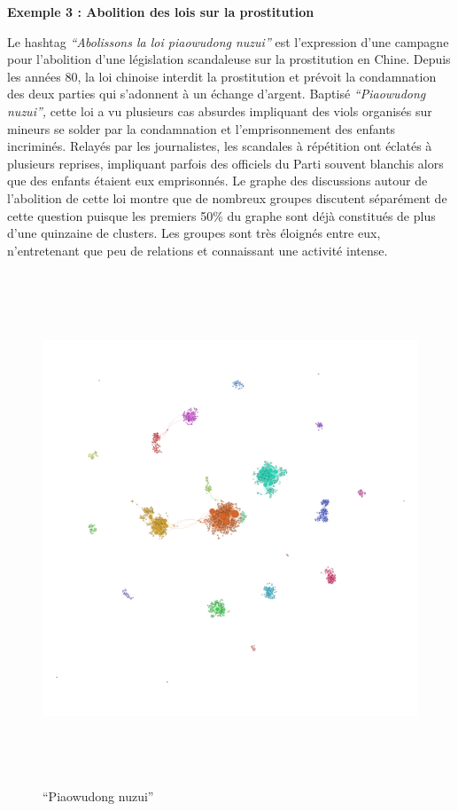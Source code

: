 \clearpage
\textbf{Exemple 3 : Abolition des lois sur la prostitution}

Le hashtag \textit{{\textquotedblleft}Abolissons la loi piaowudong
nuzui{\textquotedblright} }est l{\textquoteright}expression
d{\textquoteright}une campagne pour l{\textquoteright}abolition
d{\textquoteright}une l\'egislation scandaleuse sur la prostitution en
Chine. Depuis les ann\'ees 80, la loi chinoise interdit la prostitution
et pr\'evoit la condamnation des deux parties qui
s{\textquoteright}adonnent \`a un \'echange d{\textquoteright}argent.
Baptis\'e \textit{{\textquotedblleft}Piaowudong
nuzui{\textquotedblright}, }cette loi a vu plusieurs cas absurdes
impliquant des viols organis\'es sur mineurs se solder par la
condamnation et l{\textquoteright}emprisonnement des enfants
incrimin\'es. Relay\'es par les journalistes, les scandales \`a
r\'ep\'etition ont \'eclat\'es \`a plusieurs reprises, impliquant
parfois des officiels du Parti souvent blanchis alors que des enfants
\'etaient eux emprisonn\'es. Le graphe des discussions autour de
l{\textquoteright}abolition de cette loi montre que de nombreux groupes
discutent s\'epar\'ement de cette question puisque les premiers 50\% du
graphe sont d\'ej\`a constitu\'es de plus d{\textquoteright}une
quinzaine de clusters. Les groupes sont tr\`es \'eloign\'es entre eux,
n{\textquoteright}entretenant que peu de relations et connaissant une
activit\'e intense.

\begin{figure}[th]
    \centering
    \includegraphics[width=6.0114in,height=6.0114in]{figures/chap3/chapitre3-img19.png}
    \caption{ {\textquotedblleft}Piaowudong nuzui{\textquotedblright}}
\end{figure}


